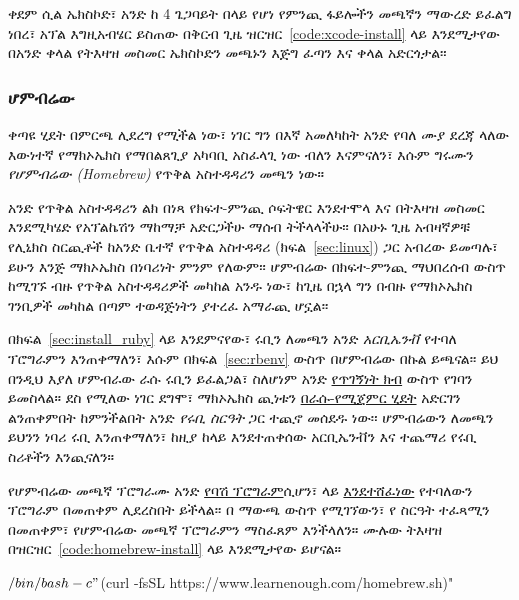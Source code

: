 ቀደም ሲል ኤክስኮድ፣ አንድ ከ 4 ጌጋባይት በላይ የሆነ የምንጪ ፋይሎችን መጫኛን ማውረድ ይፈልግ ነበረ፣ አፕል እግዚአብሄር ይስጠው በቅርብ ጊዜ ዝርዝር~\ref{code:xcode-install} ላይ እንደሚታየው በአንድ ቀላል የትእዛዝ መስመር ኤክስኮድን መጫኑን እጅግ ፈጣን እና ቀላል አድርጎታል፡፡

\begin{codelisting}
\label{code:xcode-install}
\end{codelisting}


\subsubsection{ሆምብሬው}
\label{sec:homebrew}

ቀጣዩ ሂደት በምርጫ ሊደረግ የሚችል ነው፣ ነገር ግን በእኛ አመለካከት አንድ የባለ ሙያ ደረጃ ላለው እውነተኛ የማክኦኤክስ የማበልጸጊያ አካባቢ አስፈላጊ ነው ብለን እናምናለን፣ እሱም ግሩሙን \emph{የሆምብሬው (Homebrew)} የጥቅል አስተዳዳሪን መጫን ነው።

አንድ የጥቅል አስተዳዳሪን ልክ በነጻ የክፍተ-ምንጪ ሶፍትዌር እንደተሞላ እና በትእዛዝ መስመር እንደሚካሄድ የአፕልኬሽን ማከማቻ አድርጋችሁ ማሰብ ትችላላችሁ፡፡ በአሁኑ ጊዜ አብዛኛዎቹ የሊኒክስ ስርጪቶች ከአንድ ቤተኛ የጥቅል አስተዳዳሪ (ክፍል~\ref{sec:linux}) ጋር አብረው ይመጣሉ፣ ይሁን እንጅ ማክኦኤክስ በነባሪነት ምንም የለውም፡፡ ሆምብሬው በክፍተ-ምንጪ ማህበረሰብ ውስጥ ከሚገኙ ብዙ የጥቅል አስተዳዳሪዎች መካከል አንዱ ነው፣ ከጊዜ በኋላ ግን በብዙ የማክኦኤክስ ገንቢዎች መካከል በጣም ተወዳጅነትን ያተረፈ አማራጪ ሆኗል፡፡

በክፍል~\ref{sec:install_ruby} ላይ እንደምናየው፣ ሩቢን ለመጫን አንድ \emph{አርቢኤንቭ} የተባለ ፕሮግራምን እንጠቀማለን፣ እሱም በክፍል~\ref{sec:rbenv} ውስጥ በሆምብሬው በኩል ይጫናል፡፡ ይህ በንዲህ እያለ ሆምብራው ራሱ ሩቢን ይፈልጋል፣ ስለሆነም አንድ \href{https://en.wikipedia.org/wiki/Circular_dependency}{የጥገኝነት ክብ} ውስጥ የገባን ይመስላል። ደስ የሚለው ነገር ደግሞ፣ ማክኦኤክስ ጪነቱን \href{https://en.wikipedia.org/wiki/Bootstrapping}{በራሱ-የሚጀምር ሂደት} አድርገን ልንጠቀምበት ከምንችልበት አንድ \emph{የሩቢ ስርዓት} ጋር ተጪኖ መሰደዱ ነው፡፡ ሆምብሬውን ለመጫን ይህንን ነባሪ ሩቢ እንጠቀማለን፣ ከዚያ ከላይ እንደተጠቀሰው አርቢኤንቭን እና ተጨማሪ የሩቢ ስሪቶችን እንጪናለን።

የሆምብሬው መጫኛ ፕሮግራሙ አንድ \href{https://www.learnenough.com/text-editor-tutorial/advanced_text_editing#sec-writing_an_executable_script}{የባሽ ፕሮግራም}ሲሆን፣ \lecl ላይ \href{https://www.learnenough.com/command-line-tutorial#sec-downloading_a_file}{እንደተሸፈነው}  የተባለውን ፕሮግራም በመጠቀም ሊደረስበት ይችላል፡፡ በ  ማውጫ ውስጥ የሚገኘውን፣ የ  ስርዓት ተፈጻሚን በመጠቀም፣ የሆምብሬው መጫኛ ፕሮግራምን ማስፈጸም እንችላለን። ሙሉው ትእዛዝ በዝርዝር~\ref{code:homebrew-install} ላይ እንደሚታየው ይሆናል።

\begin{codelisting}
\label{code:homebrew-install}
\begin{code}
$ /bin/bash -c "$(curl -fsSL https://www.learnenough.com/homebrew.sh)"
\end{code}
\end{codelisting}

